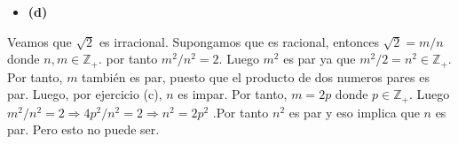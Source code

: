\documentclass{article}
\begin{document}
\begin{itemize}
\item \bf (d) \rm
\end{itemize}
Veamos que $\sqrt{2}$ es irracional. Supongamos que es racional, entonces $\sqrt{2}= m/n$ donde $n,m\in \mathbb{Z}_{+}$. por tanto $m^2/n^2=2$. Luego $m^2
$ es par ya que $m^2/2=n^2\in \mathbb{Z}_{+}$. Por tanto, $m$ también es par, puesto que el producto de dos numeros pares es par. Luego, por ejercicio (c), $n$ es impar. Por tanto, $m=2p$ donde $p\in \mathbb{Z}_{+}$. Luego $m^2/n^2=2\Rightarrow 4p^2/n^2=2\Rightarrow n^2 = 2p^2$ .Por tanto $n^2$ es par y eso implica que $n$ es par. Pero esto no puede ser.
%
%
\end{document}
